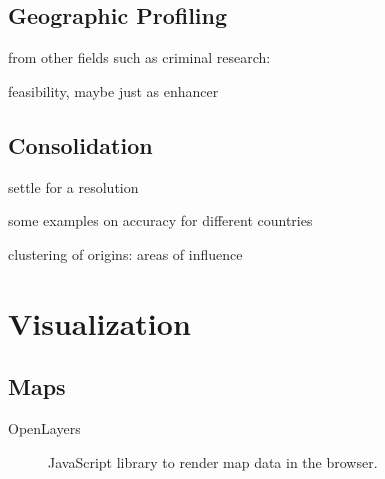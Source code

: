


\subsection{Geographic Profiling}

\begin{todos}
    \item {}
    \item {}
    \item from other fields such as criminal research: \\ 
    \item feasibility, maybe just as enhancer
\end{todos}


\subsection{Consolidation}

\begin{todos}
    \item settle for a resolution
    \item some examples on accuracy for different countries
    \item clustering of origins: areas of influence
\end{todos}



\section{Visualization}

\subsection{Maps}

\begin{description}
\item[OpenLayers] JavaScript library to render map data in the browser.
\end{description}

